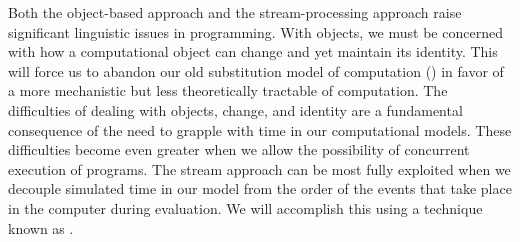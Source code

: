 Both the object-based approach and the stream-processing approach raise significant linguistic issues in programming.
With objects, we must be concerned with how a computational object can change and yet maintain its identity.
This will force us to abandon our old substitution model of computation () in favor of a more mechanistic but less theoretically tractable  of computation.
The difficulties of dealing with objects, change, and identity are a fundamental consequence of the need to grapple with time in our computational models.
These difficulties become even greater when we allow the possibility of concurrent execution of programs.
The stream approach can be most fully exploited when we decouple simulated time in our model from the order of the events that take place in the computer during evaluation.
We will accomplish this using a technique known as .







